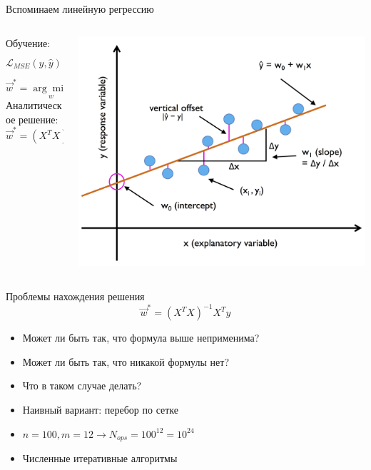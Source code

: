 \documentclass[aspectratio=169]{beamer}
\begin{document}
\begin{frame}{Вспоминаем линейную регрессию}
    \begin{columns}
        \begin{column}{.4\linewidth}
            Обучение:
            \[\mathcal{L}_{MSE}(y, \hat{y}) = \frac{1}{N} \sum_{i=1}^{N} {(y_i - \hat{y}_i)}^2\]
            \[ \vec{w}^* = \underset{w}{\arg\min} \mathcal{L} \]
            Аналитическое решение: \[ \vec{w}^* = {(X^T X)}^{-1} X^T y \]
        \end{column}
        \begin{column}{.5\linewidth}
            \centering
            \includegraphics[width=\linewidth]{graphs/fig3.png}
        \end{column}
    \end{columns}
\end{frame}

\begin{frame}{Проблемы нахождения решения}
    \large{\[ \vec{w}^* = {(X^T X)}^{-1} X^T y \]}
    \begin{itemize}
        \item Может ли быть так, что формула выше неприменима?
        \pause{}
        \item Может ли быть так, что никакой формулы нет?
        \pause{}
        \item Что в таком случае делать?
        \pause{}
        \item Наивный вариант: перебор по сетке
        \item \(n = 100, m = 12 \rightarrow N_{ops} = 100^{12} = 10^{24}\)
        \pause{}
        \item Численные итеративные алгоритмы
    \end{itemize}
\end{frame}
\end{document}
